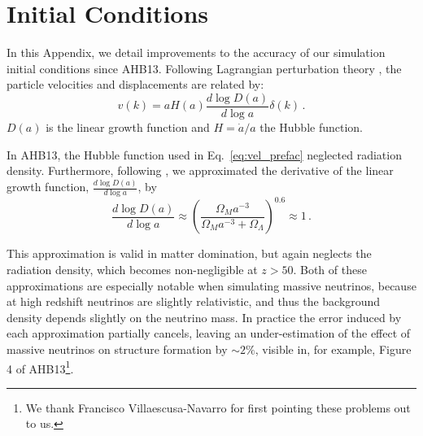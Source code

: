 \documentclass[useAMS, usenatbib]{mnras}
\begin{document}
\section{Initial Conditions}
\label{sec:initcond}


In this Appendix, we detail improvements to the accuracy of our simulation initial conditions since AHB13.
Following Lagrangian perturbation theory \citep{Zeldovich_1970, Scoccimarro_1998},
the particle velocities and displacements are related by:
\begin{equation}
v(k) = a H(a) \frac{d \log D(a)}{d \log a} \delta(k)\,.
\label{eq:vel_prefac}
\end{equation}
$D(a)$ is the linear growth function and $H = \dot{a}/a$ the Hubble function.

In AHB13, the Hubble function used in Eq.~\eqref{eq:vel_prefac}
neglected radiation density. Furthermore, following \cite{Bouchet:1995}, we
approximated the derivative of the linear growth function, $\frac{d \log D(a)}{d \log a}$, by
\begin{equation}
\frac{d \log D(a)}{d \log a} \approx \left(\frac{\Omega_M a^{-3}}{\Omega_M  a^{-3} + \Omega_\Lambda}\right)^{0.6} \approx 1\,.
\end{equation}

This approximation is valid in matter domination, but again neglects the radiation density,
which becomes non-negligible at $z > 50$. Both of these approximations are especially notable
when simulating massive neutrinos, because at high redshift neutrinos are slightly relativistic,
and thus the background density depends slightly on the neutrino mass. In practice the error
induced by each approximation partially cancels, leaving an under-estimation of the effect of
massive neutrinos on structure formation by $\sim 2 \%$, visible in, for example,
Figure 4 of AHB13\footnote{We thank Francisco Villaescusa-Navarro for first pointing these problems out to us.}.
\end{document}
